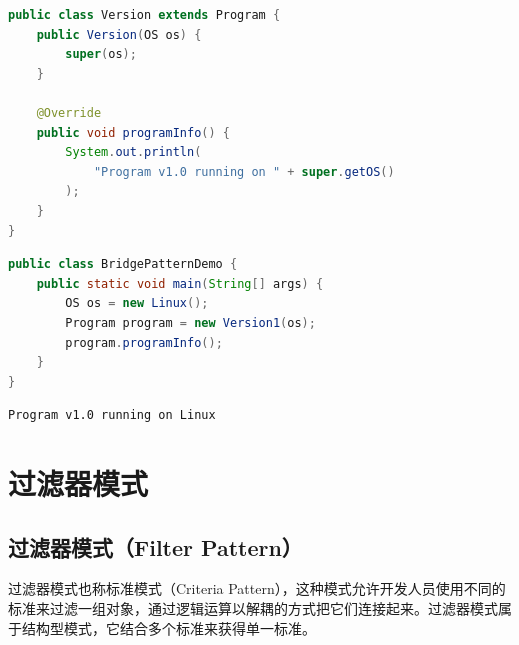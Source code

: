 \begin{lstlisting}[language=Java, title=Version.java]
public class Version extends Program {
    public Version(OS os) {
        super(os);
    }

    @Override
    public void programInfo() {
        System.out.println(
            "Program v1.0 running on " + super.getOS()
        );
    }
}
\end{lstlisting}

\begin{lstlisting}[language=Java, title=BridgePatternDemo.java]
public class BridgePatternDemo {
    public static void main(String[] args) {
        OS os = new Linux();
        Program program = new Version1(os);
        program.programInfo();
    }
}
\end{lstlisting}

\begin{tcolorbox}
    \begin{verbatim}
Program v1.0 running on Linux
\end{verbatim}
\end{tcolorbox}

\newpage

\section{过滤器模式}

\subsection{过滤器模式（Filter Pattern）}

过滤器模式也称标准模式（Criteria Pattern），这种模式允许开发人员使用不同的标准来过滤一组对象，通过逻辑运算以解耦的方式把它们连接起来。过滤器模式属于结构型模式，它结合多个标准来获得单一标准。\\

\\

